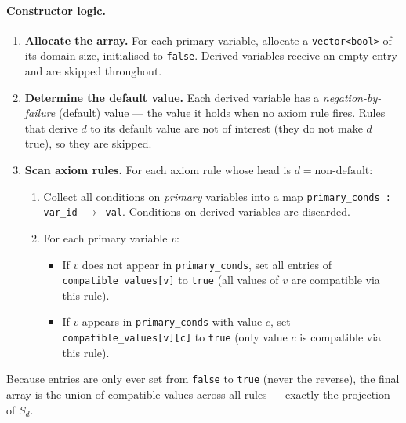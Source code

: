 \documentclass[11pt,a4paper]{article}
\begin{document}
\paragraph{Constructor logic.}
\begin{enumerate}
  \item \textbf{Allocate the array.}  For each primary variable, allocate a
        \texttt{vector<bool>} of its domain size, initialised to \texttt{false}.
        Derived variables receive an empty entry and are skipped throughout.

  \item \textbf{Determine the default value.}  Each derived variable has a
        \emph{negation-by-failure} (default) value — the value it holds when no
        axiom rule fires.  Rules that derive $d$ to its default value are not
        of interest (they do not make $d$ true), so they are skipped.

  \item \textbf{Scan axiom rules.}  For each axiom rule whose head is
        $d = \text{non-default}$:
        \begin{enumerate}
          \item Collect all conditions on \emph{primary} variables into a map
                \texttt{primary\_conds : var\_id $\to$ val}.  Conditions on
                derived variables are discarded.
          \item For each primary variable $v$:
                \begin{itemize}
                  \item If $v$ does not appear in \texttt{primary\_conds},
                        set all entries of \texttt{compatible\_values[v]} to
                        \texttt{true} (all values of $v$ are compatible via
                        this rule).
                  \item If $v$ appears in \texttt{primary\_conds} with value
                        $c$, set \texttt{compatible\_values[v][c]} to
                        \texttt{true} (only value $c$ is compatible via this
                        rule).
                \end{itemize}
        \end{enumerate}
\end{enumerate}

Because entries are only ever set from \texttt{false} to \texttt{true} (never
the reverse), the final array is the union of compatible values across all
rules — exactly the projection of $S_d$.
\end{document}
